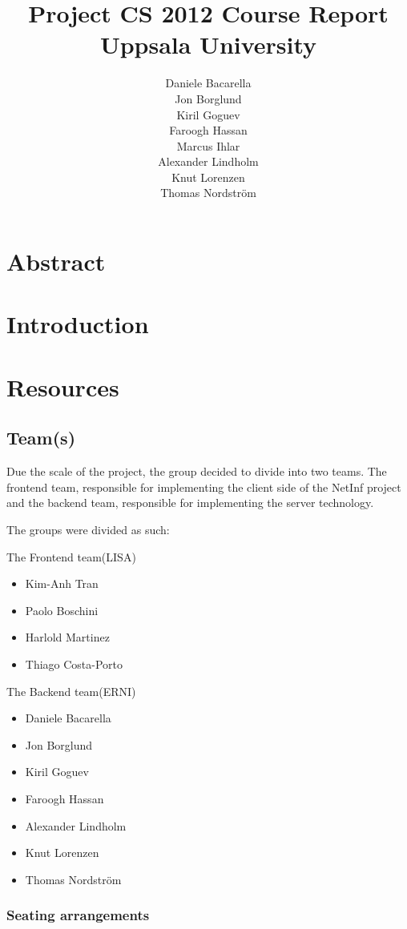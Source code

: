 \documentclass[11pt]{report}
\title{Project CS 2012 Course Report\\Uppsala University\\}
\author{Daniele Bacarella\\
Jon Borglund\\
Kiril Goguev\\
		Faroogh Hassan\\
		Marcus Ihlar\\
		Alexander Lindholm\\
		Knut Lorenzen\\
		Thomas Nordstr\"om\\
}
\date{}
\begin{document}
\maketitle

\tableofcontents

\chapter{Abstract}


\chapter{Introduction}

\chapter{Resources}

\section{Team(s)}
Due the scale of the project, the group decided to divide into two teams. The frontend team, responsible for implementing the client side of the NetInf project and the backend team, responsible for implementing the server technology.


The groups were divided as such:

The Frontend team(LISA)
\begin{itemize}
\item Kim-Anh Tran
\item Paolo Boschini
\item Harlold Martinez
\item Thiago Costa-Porto
\end{itemize}

The Backend team(ERNI) 

\begin {itemize}
\item Daniele Bacarella
\item Jon Borglund
\item Kiril Goguev
\item Faroogh Hassan
\item Alexander Lindholm
\item Knut Lorenzen
\item Thomas Nordstr\"om
\end {itemize}

\subsection{Seating arrangements}
\end{document}
